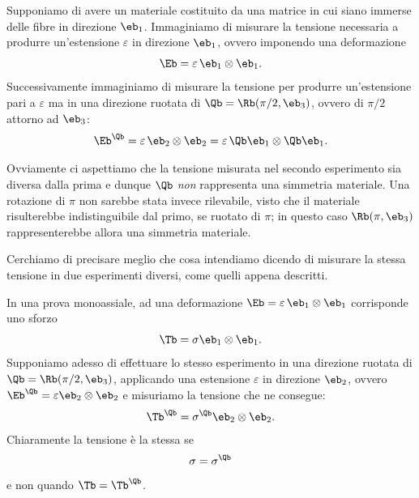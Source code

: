 Supponiamo di avere un materiale costituito da una matrice in cui siano immerse delle fibre in direzione $\eb_1$. Immaginiamo di misurare la tensione necessaria a produrre un'estensione $\varepsilon$ in direzione $\eb_1$, ovvero imponendo una deformazione
\begin{equation}
	\Eb =\varepsilon\,\eb_1\otimes\eb_1.
\end{equation}
Successivamente immaginiamo di misurare la tensione per produrre un'estensione pari a $\varepsilon$ ma in una direzione ruotata di $\Qb=\Rb (\pi/2, \eb_3)$, ovvero di $\pi/2$ attorno ad $\eb_3$:
\begin{equation}
\Eb ^\Qb =\varepsilon\, \eb_2 \otimes \eb_2= \varepsilon\,\Qb \eb_1 \otimes \Qb \eb_1.
\end{equation}

Ovviamente ci aspettiamo che  la tensione misurata nel secondo esperimento sia diversa dalla prima e dunque $\Qb$ \textit{non} rappresenta una simmetria materiale. Una rotazione di $\pi$ non sarebbe stata invece rilevabile, visto che il materiale risulterebbe indistinguibile dal primo, se ruotato di $\pi$; in questo caso $\Rb(\pi, \eb_3)$ rappresenterebbe allora una simmetria materiale.

Cerchiamo di precisare meglio che cosa intendiamo dicendo di misurare la stessa tensione in due esperimenti diversi, come quelli appena descritti.

In una prova monoassiale, ad una deformazione $\Eb=\varepsilon\,\eb_1\otimes\eb_1$ corrisponde uno sforzo
\begin{equation}
	\Tb =\sigma \eb_1\otimes\eb_1.
\end{equation}
Supponiamo adesso di effettuare lo stesso esperimento in una direzione ruotata di $\Qb=\Rb (\pi/2, \eb_3)$, applicando una estensione $\varepsilon$ in direzione $\eb_2$, ovvero $\Eb^\Qb=\varepsilon\eb_2\otimes\eb_2$ e misuriamo la tensione che ne consegue:
\begin{equation}
	\Tb^\Qb =\sigma^\Qb\eb_2\otimes \eb_2.
 \end{equation}
Chiaramente la tensione è la stessa se
\begin{equation}
	\sigma=\sigma^\Qb
\end{equation}
e non quando $\Tb =\Tb ^\Qb$.

